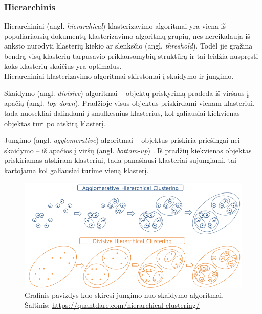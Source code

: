 \documentclass{VUMIFInfKursinis}
\newcommand{\ltang}[2]{#1 (angl. \textit{#2})}
\begin{document}
\subsubsection{Hierarchinis}

\ltang{Hierarchiniai}{hierarchical}   klasterizavimo algoritmai yra
viena iš populiariausių dokumentų klasterizavimo algoritmų grupių, nes
nereikalauja iš anksto nurodyti klasterių kiekio ar \ltang{slenksčio}{threshold}.
Todėl jie grąžina bendrą visų klasterių tarpusavio
priklausomybių struktūrą ir tai leidžia nuspręsti koks klasterių
skaičius yra optimalus.\\
Hierarchiniai klasterizavimo algoritmai skirstomai į skaidymo ir
jungimo.


\ltang{Skaidymo}{divisive} algoritmai – objektų
priskyrimą pradeda \ltang{iš viršaus į apačią}{top-down}.
Pradžioje visus objektus priskirdami vienam klasteriui, tada nuosekliai
dalindami į smulkesnius klasterius, kol galiausiai kiekvienas objektas
turi po atskirą klasterį.


\ltang{Jungimo}{agglomerative}   algoritmai – objektus priskiria
priešingai nei skaidymo – \ltang{iš apačios į viršų}{bottom-up}  .
Iš pradžių kiekvienas objektas priskiriamas atskiram klasteriui, tada
panašiausi klasteriai sujungiami, tai kartojama kol galiausiai turime
vieną klasterį.

\begin{figure}[H]
  \centering
  \includegraphics[scale=.5]{img/aggVSdiv}
  \caption{Grafinis pavizdys kuo skiresi jungimo nuo skaidymo algoritmai.\\
           Šaltinis: \url{https://quantdare.com/hierarchical-clustering/}}
\end{figure}

\end{document}
